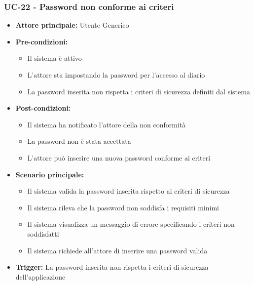 \documentclass[a4paper,12pt]{article}
\begin{document}
\subsubsection{UC-22 - Password non conforme ai criteri} \label{subsec:UC-22}
\begin{itemize}
    \item \textbf{Attore principale:} Utente Generico
    \item \textbf{Pre-condizioni:}
    \begin{itemize}
        \item Il sistema è attivo
        \item L'attore sta impostando la password per l'accesso al diario
        \item La password inserita non rispetta i criteri di sicurezza definiti dal sistema
    \end{itemize}
    \item \textbf{Post-condizioni:} 
    \begin{itemize}
        \item Il sistema ha notificato l'attore della non conformità
        \item La password non è stata accettata
        \item L'attore può inserire una nuova password conforme ai criteri
    \end{itemize}
    \item \textbf{Scenario principale:} 
    \begin{itemize}
        \item Il sistema valida la password inserita rispetto ai criteri di sicurezza
        \item Il sistema rileva che la password non soddisfa i requisiti minimi
        \item Il sistema visualizza un messaggio di errore specificando i criteri non soddisfatti
        \item Il sistema richiede all'attore di inserire una password valida
    \end{itemize}
    \item \textbf{Trigger:} La password inserita non rispetta i criteri di sicurezza dell'applicazione
\end{itemize}
\end{document}
